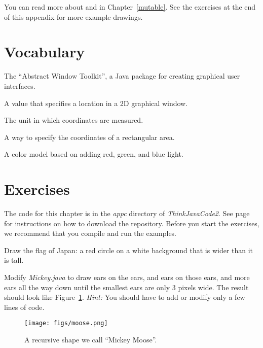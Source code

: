 You can read more about  and  in Chapter~\ref{mutable}.
See the exercises at the end of this appendix for more example drawings.


\section{Vocabulary}
\label{graphics_vocabulary}

\begin{description}

The ``Abstract Window Toolkit'', a Java package for creating graphical user interfaces.

A value that specifies a location in a 2D graphical window.

The unit in which coordinates are measured.

A way to specify the coordinates of a rectangular area.

A color model based on adding red, green, and blue light.

\end{description}


\section{Exercises}
\label{graphics_exercises}

The code for this chapter is in the {\it appc} directory of {\it ThinkJavaCode2}.
See page~\pageref{code} for instructions on how to download the repository.
Before you start the exercises, we recommend that you compile and run the examples.


\begin{exercise}

Draw the flag of Japan: a red circle on a white background that is wider than it is tall.

\end{exercise}


\begin{exercise}

Modify {\it Mickey.java} to draw ears on the ears, and ears on those ears, and more ears all the way down until the smallest ears are only 3 pixels wide.
The result should look like Figure~\ref{fig.moose}.
%
{\em Hint:} You should have to add or modify only a few lines of code.

\begin{figure}[!ht]
\begin{center}
\texttt{[image: figs/moose.png]}
\caption{A recursive shape we call ``Mickey Moose''.}
\label{fig.moose}
\end{center}
\end{figure}

\end{exercise}



